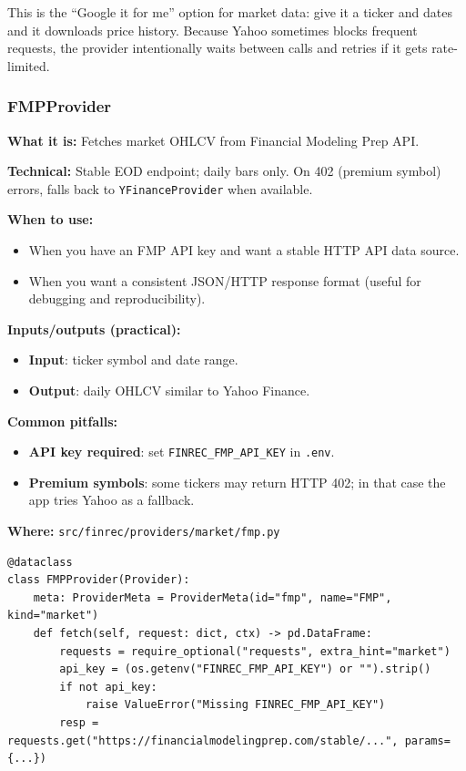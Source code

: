 \documentclass[11pt,a4paper]{article}
\begin{document}
\begin{intuitionbox}
This is the ``Google it for me'' option for market data: give it a ticker and dates and it downloads price history. Because Yahoo sometimes blocks frequent requests, the provider intentionally waits between calls and retries if it gets rate-limited.
\end{intuitionbox}

\subsubsection{FMPProvider}\label{sec:fmp}

\textbf{What it is:} Fetches market OHLCV from Financial Modeling Prep API.

\textbf{Technical:} Stable EOD endpoint; daily bars only. On 402 (premium symbol) errors, falls back to \texttt{YFinanceProvider} when available.

\textbf{When to use:}
\begin{itemize}[leftmargin=2em]
  \item When you have an FMP API key and want a stable HTTP API data source.
  \item When you want a consistent JSON/HTTP response format (useful for debugging and reproducibility).
\end{itemize}

\textbf{Inputs/outputs (practical):}
\begin{itemize}[leftmargin=2em]
  \item \textbf{Input}: ticker symbol and date range.
  \item \textbf{Output}: daily OHLCV similar to Yahoo Finance.
\end{itemize}

\textbf{Common pitfalls:}
\begin{itemize}[leftmargin=2em]
  \item \textbf{API key required}: set \texttt{FINREC\_FMP\_API\_KEY} in \texttt{.env}.
  \item \textbf{Premium symbols}: some tickers may return HTTP 402; in that case the app tries Yahoo as a fallback.
\end{itemize}

\textbf{Where:} \texttt{src/finrec/providers/market/fmp.py}

\begin{lstlisting}
@dataclass
class FMPProvider(Provider):
    meta: ProviderMeta = ProviderMeta(id="fmp", name="FMP", kind="market")
    def fetch(self, request: dict, ctx) -> pd.DataFrame:
        requests = require_optional("requests", extra_hint="market")
        api_key = (os.getenv("FINREC_FMP_API_KEY") or "").strip()
        if not api_key:
            raise ValueError("Missing FINREC_FMP_API_KEY")
        resp = requests.get("https://financialmodelingprep.com/stable/...", params={...})
\end{lstlisting}
\end{document}
